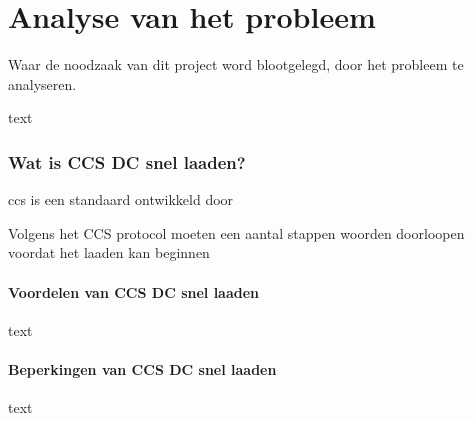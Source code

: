 \chapter{Analyse van het probleem}
\label{Analyse_van_het_probleem}

\begin{center}
    \begin{minipage}{0.5\textwidth}
        \begin{small}
            Waar de noodzaak van dit project word blootgelegd, door het probleem te analyseren.
        \end{small} 
    \end{minipage}
    \vspace{0.5cm}
\end{center}

text

\subsection{Wat is CCS DC snel laaden?}

\ac{ccs} is een standaard ontwikkeld door 

Volgens het CCS protocol moeten een aantal stappen woorden doorloopen voordat
het laaden kan beginnen


\subsubsection{Voordelen van CCS DC snel laaden}

text

\subsubsection{Beperkingen van CCS DC snel laaden}

text
